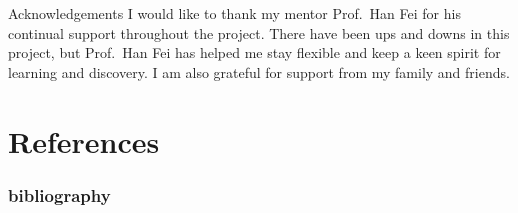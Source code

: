 \documentclass[xcolor={dvipsnames,svgnames}]{beamer}
\begin{document}
\begin{frame}{Acknowledgements}
I would like to thank my mentor Prof.~Han Fei for his continual support throughout the project. There have been ups and downs in this project, but Prof.~Han Fei has helped me stay flexible and keep a keen spirit for learning and discovery. I am also grateful for support from my family and friends.
\end{frame}
\section{References}
\frametitle{bibliography}
\printbibliography[heading=bibintoc]
\end{document}
